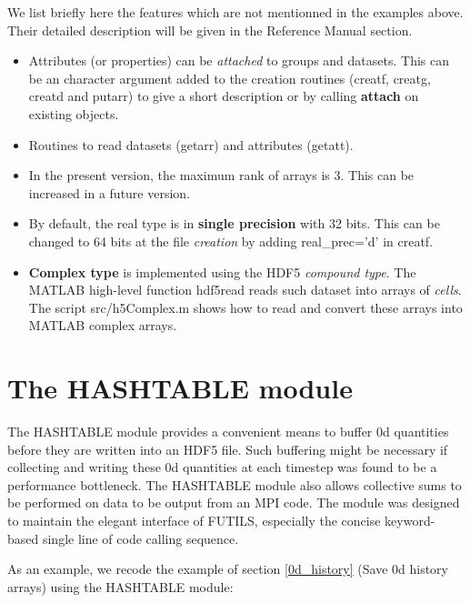 \documentclass[a4paper]{article}
\begin{document}
We list briefly here the features which are not mentionned in the examples
above. Their detailed description will be given in the Reference Manual
section.
\begin{itemize}
\item Attributes (or properties) can be {\itshape attached\/} to groups and
datasets. This can be an character argument added to the creation routines
(creatf, creatg, creatd and putarr) to give a short description or by calling
{\bfseries attach} on existing objects.
\item  Routines to read datasets (getarr) and attributes (getatt).
\item In the present version, the maximum rank of arrays is 3. This can be
increased in a future version.
\item By default, the real type is in {\bfseries single precision} with 32 bits. This can
be changed to 64 bits at the file {\itshape creation\/} by adding {\ttfamily real\_prec='d'}
in {\ttfamily creatf}.
\item {\bfseries Complex type} is implemented using the HDF5 {\itshape compound
type\/}. The MATLAB high-level function {\ttfamily hdf5read} reads such dataset into arrays
of {\itshape cells\/}. The script {\ttfamily src/h5Complex.m} shows
how to read and convert these arrays into MATLAB {\ttfamily complex} arrays.
\end{itemize}





\section{The HASHTABLE module}

The HASHTABLE module provides a convenient means to buffer 0d quantities before
they are written into an HDF5 file. Such buffering might be necessary if
collecting and writing these 0d quantities at each timestep was found to be
a performance bottleneck. The HASHTABLE module also allows collective sums to be
performed on data to be output from an MPI code. The module was designed to maintain the elegant
interface of FUTILS, especially the concise keyword-based single line of code
calling sequence.

As an example, we recode the example of section \ref{0d_history} {(Save 0d history arrays)} using
the HASHTABLE module:
\end{document}
